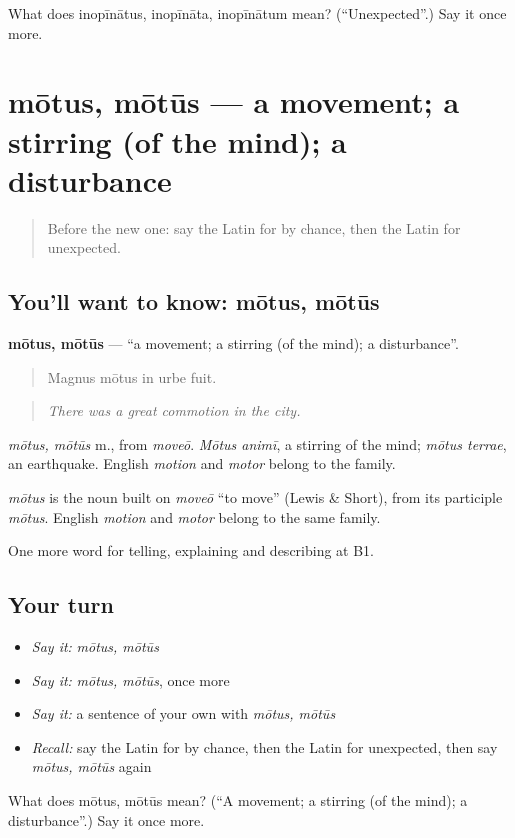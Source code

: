 \begin{tcolorbox}[breakable,colback=teal!4,colframe=teal!35!black,title={Before you move on}]
What does inopīnātus, inopīnāta, inopīnātum mean? (\textquotedblleft{}Unexpected\textquotedblright{}.) Say it once more.
\end{tcolorbox}
\section[mōtus, mōtūs]{mōtus, mōtūs — a movement; a stirring (of the mind); a disturbance}

\label{lesson:LA-C375-motus}



\begin{quote}
Before the new one: say the Latin for by chance, then the Latin for unexpected.
\end{quote}

\subsection*{You'll want to know: mōtus, mōtūs}
\textbf{mōtus, mōtūs} — \textquotedblleft{}a movement; a stirring (of the mind); a disturbance\textquotedblright{}.

\begin{quote}
Magnus mōtus in urbe fuit.
\end{quote}

\begin{quote}
\emph{There was a great commotion in the city.}
\end{quote}

\emph{mōtus, mōtūs} m., from \emph{moveō}. \emph{Mōtus animī}, a stirring of the mind; \emph{mōtus terrae}, an earthquake. English \emph{motion} and \emph{motor} belong to the family.

\begin{cousinweb}
\emph{mōtus} is the noun built on \emph{moveō} \textquotedblleft{}to move\textquotedblright{} (Lewis \& Short), from its participle \emph{mōtus}. English \emph{motion} and \emph{motor} belong to the same family.
\end{cousinweb}

\begin{grammarlens}[title={What you've built}]
One more word for telling, explaining and describing at B1.
\end{grammarlens}

\subsection*{Your turn}
\begin{itemize}
\raggedright
  \item \emph{Say it:} \emph{mōtus, mōtūs}
  \item \emph{Say it:} \emph{mōtus, mōtūs}, once more
  \item \emph{Say it:} a sentence of your own with \emph{mōtus, mōtūs}
  \item \emph{Recall:} say the Latin for by chance, then the Latin for unexpected, then say \emph{mōtus, mōtūs} again
\end{itemize}

\begin{tcolorbox}[breakable,colback=teal!4,colframe=teal!35!black,title={Before you move on}]
What does mōtus, mōtūs mean? (\textquotedblleft{}A movement; a stirring (of the mind); a disturbance\textquotedblright{}.) Say it once more.
\end{tcolorbox}
